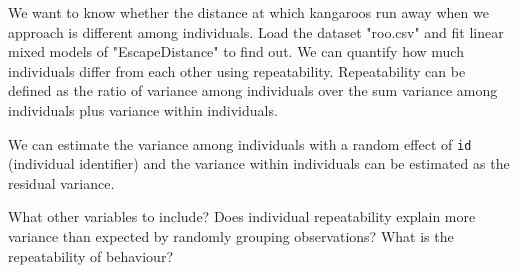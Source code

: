 \documentclass[12pt,a4paper]{scrartcl}\usepackage[]{graphicx}\usepackage[]{color}
\begin{document}
\begin{Exercise}[difficulty=1, title={xxx}]

\end{Exercise}
\begin{Answer}

\end{Answer}


\begin{Exercise}[difficulty=3, title={Do kangaroos have personalities?}]

We want to know whether the distance at which kangaroos run away when we approach is different among individuals. Load the dataset "roo.csv" and fit linear mixed models of "EscapeDistance" to find out. We can quantify how much individuals differ from each other using repeatability. Repeatability can be defined as the ratio of variance among individuals over the sum variance among individuals plus variance within individuals. 

We can estimate the variance among individuals with a random effect of \texttt{id} (individual identifier) and the variance within individuals can be estimated as the residual variance. 

What other variables to include? Does individual repeatability explain more variance than expected by randomly grouping observations? What is the repeatability of behaviour?
\end{Exercise}
\end{document}
